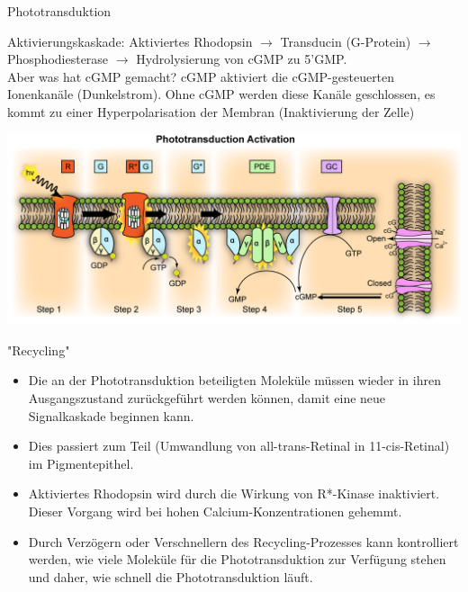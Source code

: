 \documentclass{beamer}
\begin{document}
\begin{frame}{Phototransduktion}

Aktivierungskaskade: Aktiviertes Rhodopsin \(\rightarrow\) Transducin (G-Protein) \(\rightarrow\) Phosphodiesterase \(\rightarrow\) Hydrolysierung von cGMP zu 5'GMP.  \\[0.5 cm]

Aber was hat cGMP gemacht? \pause cGMP aktiviert die cGMP-gesteuerten Ionenkanäle (Dunkelstrom). Ohne cGMP werden diese Kanäle geschlossen, es kommt zu einer Hyperpolarisation der Membran (Inaktivierung der Zelle)

\begin{center}
    \includegraphics[width=\textwidth]{Phototransduction.png}
\end{center}
      
\end{frame}


\begin{frame}{"Recycling"}


\begin{itemize}
    \item 
    Die an der Phototransduktion beteiligten Moleküle müssen wieder in ihren Ausgangszustand zurückgeführt werden können, damit eine neue Signalkaskade beginnen kann. 
\item
Dies passiert zum Teil (Umwandlung von all-trans-Retinal in 11-cis-Retinal) im Pigmentepithel. 
\item
Aktiviertes Rhodopsin wird durch die Wirkung von R*-Kinase inaktiviert. Dieser Vorgang wird bei hohen Calcium-Konzentrationen gehemmt. 
\item
Durch Verzögern oder Verschnellern des Recycling-Prozesses kann kontrolliert werden, wie viele Moleküle für die Phototransduktion zur Verfügung stehen und daher, wie schnell die Phototransduktion läuft. 

\end{itemize}





    
\end{frame}
\end{document}
